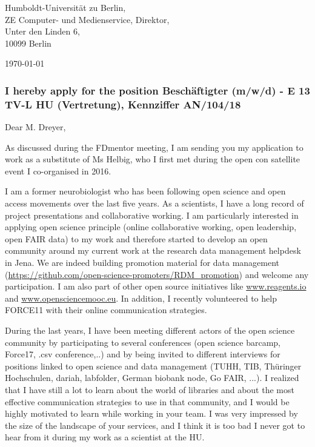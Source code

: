 \hspace*{0.5\linewidth}
\begin{minipage}{0.4\linewidth}
Humboldt-Universit\"{a}t zu Berlin,\\ ZE Computer- und Medienservice, Direktor,\\ Unter den Linden 6, \\10099 Berlin

\end{minipage}

\vspace {-0.8cm} 
\today

\vspace {-0.8cm} 

%
\subsubsection* {I hereby apply for the position Besch\"{a}ftigter (m/w/d) - E 13 TV-L HU (Vertretung), Kennziffer
AN/104/18
}
  
\vspace {-0.8cm} 
Dear M. Dreyer,

As discussed during the FDmentor meeting, I am sending you my application to work as a substitute of Ms Helbig, who I first met during the open con satellite event I co-organised in 2016.  

I am a former neurobiologist who has been following open science and open access movements over the last five years. As a scientists, I have a long record of project presentations and collaborative working. I am particularly interested in applying open science principle (online collaborative working, open leadership, open FAIR data) to my work and therefore started to develop an open community around my current work at the research data management helpdesk in Jena. We are indeed building promotion material for data management (\url{https://github.com/open-science-promoters/RDM_promotion}) and welcome any participation. I am also part of other open source initiatives like \url{www.reagents.io} and \url{www.opensciencemooc.eu}. In addition, I recently volunteered to help FORCE11 with their online communication strategies.


During the last years, I have been meeting different actors of the open science community by participating to  several conferences (open science barcamp, Force17, .csv conference,..) and by being invited to different interviews for positions linked to open science and data management (TUHH, TIB, Th\"{u}ringer Hochschulen, dariah, labfolder, German biobank node,  Go FAIR, ...).
 I realized that I have still a lot to learn about the world of libraries and about the  most effective communication strategies to use in that community, and I would be highly motivated to learn while working in your team. I was very impressed by the size of the landscape of your services, and I think it is too bad I never got to hear from it during my work as a scientist at the HU. 
 
